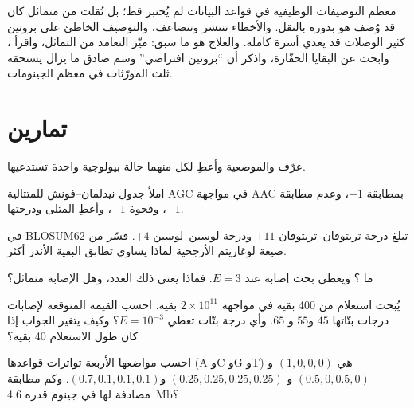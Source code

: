 \begin{remark}\label{rem:b3:bioinformatics:limits}
معظم التوصيفات الوظيفية في قواعد البيانات لم يُختبر قط؛ بل
نُقلت من متماثل كان قد وُصف هو بدوره
بالنقل. والأخطاء تنتشر وتتضاعف، والتوصيف الخاطئ على
بروتين كثير الوصلات قد يعدي أسرة كاملة. والعلاج هو ما
سبق: ميّز التعامد من التماثل، واقرأ ،
وابحث عن البقايا الحفّازة، واذكر أن ``بروتين
افتراضي'' وسم صادق ما يزال يستحقه ثلث المورّثات في معظم الجينومات.
\end{remark}

\section{تمارين}

\begin{exercise}[$\star$]\label{exo:b3:bioinformatics:1}
عرّف  والموضعية وأعطِ لكل منهما حالة بيولوجية
واحدة تستدعيها.
\end{exercise}

\begin{exercise}[$\star$]\label{exo:b3:bioinformatics:2}
املأ جدول نيدلمان--فونش للمتتالية AGC في مواجهة AAC بمطابقة $+1$،
وعدم مطابقة $-1$، وفجوة $-1$، وأعطِ  المثلى ودرجتها.
\end{exercise}

\begin{exercise}[$\star$]\label{exo:b3:bioinformatics:3}
في BLOSUM62 تبلغ درجة تربتوفان--تربتوفان $+11$ ودرجة لوسين--لوسين
$+4$. فسّر من صيغة لوغاريتم الأرجحية لماذا يساوي تطابق البقية
الأندر أكثر.
\end{exercise}

\begin{exercise}[$\star$]\label{exo:b3:bioinformatics:4}
ما ؟ ويعطي بحث إصابة عند $E = 3$. فماذا يعني ذلك
العدد، وهل الإصابة متماثل؟
\end{exercise}

\begin{exercise}[$\star\star$]\label{exo:b3:bioinformatics:5}
يُبحث استعلام من \num{400} بقية في مواجهة $2\times 10^{11}$
بقية. احسب القيمة المتوقعة لإصابات درجات بتّاتها $45$ و$55$ و
$65$. وأي درجة بتّات تعطي $E = 10^{-3}$؟ وكيف يتغير الجواب
إذا كان طول الاستعلام \num{40} بقية؟
\end{exercise}

\begin{exercise}[$\star\star$]\label{exo:b3:bioinformatics:6}
احسب   مواضعها الأربعة تواترات قواعدها
(A وC وG وT) هي $(1,0,0,0)$ و$(0.5,0,0.5,0)$ و
$(0.25,0.25,0.25,0.25)$ و$(0.7,0.1,0.1,0.1)$. وكم مطابقة مصادفة
لها في جينوم قدره \qty{4.6}{Mb}؟
\end{exercise}

